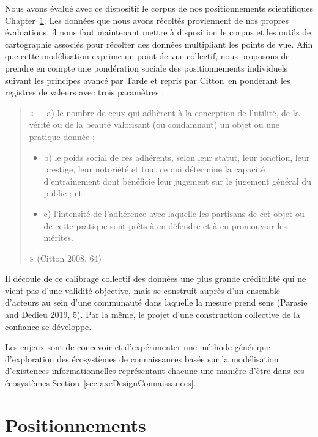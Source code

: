 \documentclass[
  letterpaper,
  DIV=11,
  numbers=noendperiod]{scrreprt}
\begin{document}
Nous avons évalué avec ce dispositif le corpus de nos positionnements
scientifiques Chapter~\ref{sec-positionnements}. Les données que nous
avons récoltés proviennent de nos propres évaluations, il nous faut
maintenant mettre à disposition le corpus et les outils de cartographie
associés pour récolter des données multipliant les points de vue. Afin
que cette modélisation exprime un point de vue collectif, nous proposons
de prendre en compte une pondération sociale des positionnements
individuels suivant les principes avancé par Tarde et repris par
Citton~en pondérant les registres de valeurs avec trois paramètres :

\begin{quote}
«~ - a) le nombre de ceux qui adhèrent à la conception de l'utilité, de
la vérité ou de la beauté valorisant (ou condamnant) un objet ou une
pratique donnée ;

\begin{itemize}
\item
  b) le poids social de ces adhérents, selon leur statut, leur fonction,
  leur prestige, leur notoriété et tout ce qui détermine la capacité
  d'entraînement dont bénéficie leur jugement sur le jugement général du
  public ; et
\item
  c) l'intensité de l'adhérence avec laquelle les partisans de cet objet
  ou de cette pratique sont prêts à en défendre et à en promouvoir les
  mérites.
\end{itemize}

» (Citton 2008, 64)
\end{quote}

Il découle de ce calibrage collectif des données une plus grande
crédibilité qui ne vient pas d'une validité objective, mais se construit
auprès d'un ensemble d'acteurs au sein d'une communauté dans laquelle la
mesure prend sens (Parasie and Dedieu 2019, 5). Par la même, le projet
d'une construction collective de la confiance se développe.

Les enjeux sont de concevoir et d'expérimenter une méthode générique
d'exploration des écosystèmes de connaissances basée sur la modélisation
d'existences informationnelles représentant chacune une manière d'être
dans ces écosystèmes Section~\ref{sec-axeDesignConnaissances}.

\hypertarget{sec-positionnements}{%
\chapter{Positionnements}\label{sec-positionnements}}
\end{document}
